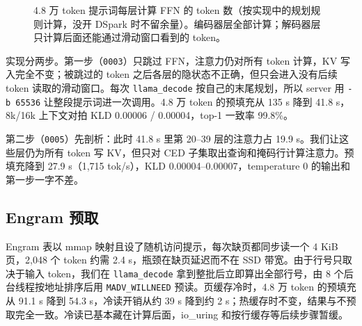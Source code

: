 \documentclass[11pt,a4paper]{article}
\newcommand{\code}[1]{\texttt{#1}}
\newcommand{\tps}{tok/s}
\begin{document}
\begin{figure}[t]
  \centering
  \caption{4.8 万 token 提示词每层计算 FFN 的 token 数（按实现中的规划规则计算，没开 DSpark 时不留余量）。编码器层全部计算；解码器层只计算后面还能通过滑动窗口看到的 token。}
  \label{fig:ced}
\end{figure}

实现分两步。第一步（\code{0003}）只跳过 FFN，注意力仍对所有 token 计算，KV 写入完全不变；被跳过的 token 之后各层的隐状态不正确，但只会进入没有后续 token 读取的滑动窗口。每次 \code{llama\_decode} 按自己的末尾规划，所以 server 用 \code{-b 65536} 让整段提示词进一次调用。4.8 万 token 的预填充从 135 s 降到 41.8 s，8k/16k 上下文对拍 KLD 0.00006 / 0.00004，top-1 一致率 99.8\%。

第二步（\code{0005}）先剖析：此时 41.8 s 里第 20--39 层的注意力占 19.9 s。我们让这些层仍为所有 token 写 KV，但只对 CED 子集取出查询和掩码行计算注意力。预填充降到 27.9 s（1,715 \tps{}），KLD 0.00004--0.00007，temperature 0 的输出和第一步一字不差。

\subsection{Engram 预取}

Engram 表以 mmap 映射且设了随机访问提示，每次缺页都同步读一个 4 KiB 页，2,048 个 token 约需 2.4 s，瓶颈在缺页延迟而不在 SSD 带宽。由于行号只取决于输入 token，我们在 \code{llama\_decode} 拿到整批后立即算出全部行号，由 8 个后台线程按地址排序后用 \code{MADV\_WILLNEED} 预读。页缓存冷时，4.8 万 token 的预填充从 91.1 s 降到 54.3 s，冷读开销从约 39 s 降到约 2 s；热缓存时不变，结果与不预取完全一致。冷读已基本藏在计算后面，io\_uring 和按行缓存等后续步骤暂缓。
\end{document}
